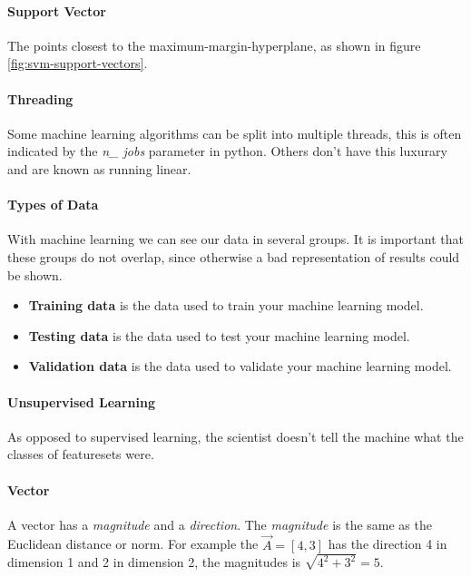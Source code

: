 \paragraph{Support Vector}
The points closest to the maximum-margin-hyperplane, as shown in figure \ref{fig:svm-support-vectors}.

\paragraph{Threading} 
Some machine learning algorithms can be split into multiple threads, this is often indicated by the \emph{n\_ jobs} parameter in python. Others don't have this luxurary and are known as running linear.

\paragraph{Types of Data} 
With machine learning we can see our data in several groups. It is important that these groups do not overlap, since otherwise a bad representation of results could be shown.
\begin{itemize}
	\item \textbf{Training data} is the data used to train your machine learning model.
	\item \textbf{Testing data} is the data used to test your machine learning model.
	\item \textbf{Validation data} is the data used to validate your machine learning model.
\end{itemize}

\paragraph{Unsupervised Learning}
As opposed to supervised learning, the scientist doesn't tell the machine what the classes of featuresets were.

\paragraph{Vector}
A vector has a \emph{magnitude} and a \emph{direction}. The \emph{magnitude} is the same as the Euclidean distance or norm. For example the $\vec{A} = [4, 3]$ has the direction 4 in dimension 1 and 2 in dimension 2, the magnitudes is $\sqrt{4^2 + 3^2} = 5$. 


 
